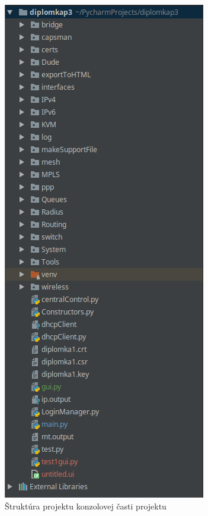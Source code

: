 \begin{figure}[H]
\centering
\includegraphics[scale=0.4]{../text/struktura.png}
\caption{Štruktúra projektu konzolovej časti projektu}
\label{fig:structure}
\end{figure} 